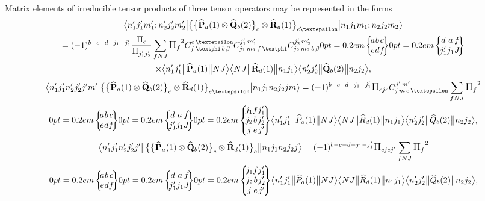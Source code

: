 Matrix elements of irreducible tensor products of three tensor operators may be represented in the forms
\begin{multline}
\braOket{ n_{1}^{\prime} j_{1}^{\prime} m_{1}^{\prime} ; n_{2}^{\prime} j_{2}^{\prime} m_{2}^{\prime}}{\bigl\{\bigl\{\widehat{\vect{P}}_{a}(1) \otimes \widehat{\vect{Q}}_{b}(2)\bigr\}_{c} \otimes \widehat{\vect{R}}_{d}(1)\bigr\}_{e \varepsilon}}{n_{1} j_{1} m_{1} ; n_{2} j_{2} m_{2}} \\
 =(-1)^{b-c-d-j_{1}-j_{1}^{\prime}} \frac{\Fact{c}}{\Fact{j_{1}^{\prime} j_{2}^{\prime}}} \sum_{f N J} \Fact{f}^{2}
\clebsch{f}{\varphi}{b}{\beta}{e}{\varepsilon} 
\clebsch{j_{1}}{m_{1}}{f}{\varphi}{j_{1}^{\prime}}{m_{1}^{\prime}} 
\clebsch{j_{2}}{m_{2}}{b}{\beta}{j_{2}^{\prime}}{m_{2}^{\prime}}
\sixj{a}{b}{c}{e}{d}{f}
\sixj{d}{a}{f}{j_{1}^{\prime}}{j_{1}}{J} \\
 \times
\braOketred{ n_{1}^{\prime} j_{1}^{\prime}}{\widehat{\vect{P}}_{a}(1)}{ N J}
\braOketred{ N J}{\widehat{\vect{R}}_{d}(1)}{ n_{1} j_{1}}
\braOketred{ n_{2}^{\prime} j_{2}^{\prime}}{\widehat{\vect{Q}}_{b}(2)}{ n_{2} j_{2}},  \label{eq:13:1:30}
\end{multline}
\begin{multline}
\braOket{ n_{1}^{\prime} j_{1}^{\prime} n_{2}^{\prime} j_{2}^{\prime} j^{\prime} m^{\prime}}{\bigl\{\bigl\{\widehat{\vect{P}}_{a}(1) \otimes \widehat{\vect{Q}}_{b}(2)\bigr\}_{c} \otimes \widehat{\vect{R}}_{d}(1)\bigr\}_{e \varepsilon}}{n_{1} j_{1} n_{2} j_{2} j m}=(-1)^{b-c-d-j_{1}-j_{1}^{\prime}} \Fact{c j e} 
\clebsch{j}{m}{e}{\varepsilon}{j^{\prime}}{m^{\prime}} 
\sum_{f N J} \Fact{f}^{2} \\
\sixj{a}{b}{c}{e}{d}{f}
\sixj{d}{a}{f}{j_{1}^{\prime}}{j_{1}}{J}
\ninej{j_{1}}{f}{j_{1}^{\prime}}{j_{2}}{b}{j_{2}^{\prime}}{j}{e}{j^{\prime}}
\braOketred{ n_{1}^{\prime} j_{1}^{\prime}}{\widehat{P}_{a}(1)}{ N J}
\braOketred{ N J}{\widehat{R}_{d}(1)}{ n_{1} j_{1}}
\braOketred{n_{2}^{\prime} j_{2}^{\prime}}{\widehat{Q}_{b}(2)}{ n_{2} j_{2}},  \label{eq:13:1:31}
\end{multline}
\begin{multline*}
\braOketred{ n_{1}^{\prime} j_{1}^{\prime} n_{2}^{\prime} j_{2}^{\prime} j^{\prime}}{\bigl\{\bigl\{\widehat{\vect{P}}_{a}(1) \otimes \widehat{\vect{Q}}_{b}(2)\bigr\}_{c} \otimes \widehat{\vect{R}}_{d}(1)\bigr\}_{e}}{n_{1} j_{1} n_{2} j_{2} j}=(-1)^{b-c-d-j_{1}-j_{1}^{\prime}} \Fact{c j e j^{\prime}}
\sum_{f N J} \Fact{f}^{2} \\
\sixj{a}{b}{c}{e}{d}{f}
\sixj{d}{a}{f}{j_{1}^{\prime}}{j_{1}}{J}
\ninej{j_{1}}{f}{j_{1}^{\prime}}{j_{2}}{b}{j_{2}^{\prime}}{j}{e}{j^{\prime}}
\braOketred{ n_{1}^{\prime} j_{1}^{\prime}}{\widehat{P}_{a}(1)}{ N J}
\braOketred{ N J}{\widehat{R}_{d}(1)}{ n_{1} j_{1}}
\braOketred{n_{2}^{\prime} j_{2}^{\prime}}{\widehat{Q}_{b}(2)}{ n_{2} j_{2}},
\end{multline*}

